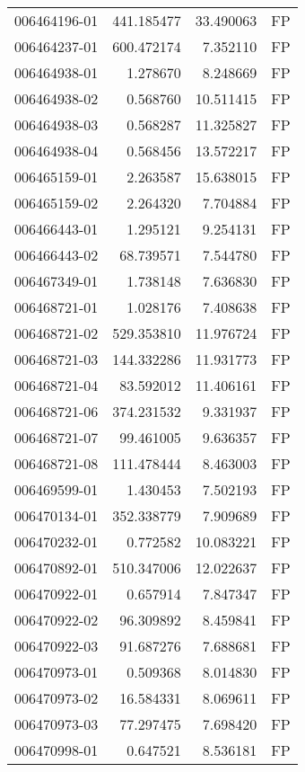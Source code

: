 \begin{tabular}{lrrl}
006464196-01 &  441.185477 &    33.490063 &   FP \\
006464237-01 &  600.472174 &     7.352110 &   FP \\
006464938-01 &    1.278670 &     8.248669 &   FP \\
006464938-02 &    0.568760 &    10.511415 &   FP \\
006464938-03 &    0.568287 &    11.325827 &   FP \\
006464938-04 &    0.568456 &    13.572217 &   FP \\
006465159-01 &    2.263587 &    15.638015 &   FP \\
006465159-02 &    2.264320 &     7.704884 &   FP \\
006466443-01 &    1.295121 &     9.254131 &   FP \\
006466443-02 &   68.739571 &     7.544780 &   FP \\
006467349-01 &    1.738148 &     7.636830 &   FP \\
006468721-01 &    1.028176 &     7.408638 &   FP \\
006468721-02 &  529.353810 &    11.976724 &   FP \\
006468721-03 &  144.332286 &    11.931773 &   FP \\
006468721-04 &   83.592012 &    11.406161 &   FP \\
006468721-06 &  374.231532 &     9.331937 &   FP \\
006468721-07 &   99.461005 &     9.636357 &   FP \\
006468721-08 &  111.478444 &     8.463003 &   FP \\
006469599-01 &    1.430453 &     7.502193 &   FP \\
006470134-01 &  352.338779 &     7.909689 &   FP \\
006470232-01 &    0.772582 &    10.083221 &   FP \\
006470892-01 &  510.347006 &    12.022637 &   FP \\
006470922-01 &    0.657914 &     7.847347 &   FP \\
006470922-02 &   96.309892 &     8.459841 &   FP \\
006470922-03 &   91.687276 &     7.688681 &   FP \\
006470973-01 &    0.509368 &     8.014830 &   FP \\
006470973-02 &   16.584331 &     8.069611 &   FP \\
006470973-03 &   77.297475 &     7.698420 &   FP \\
006470998-01 &    0.647521 &     8.536181 &   FP \\

\end{tabular}
